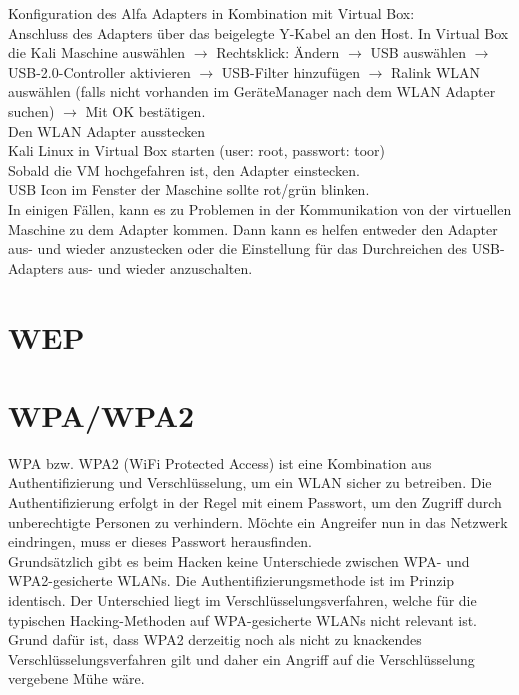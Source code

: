 Konfiguration des Alfa Adapters in Kombination mit Virtual Box:\\

Anschluss des Adapters über das beigelegte Y-Kabel an den Host.
In Virtual Box die Kali Maschine auswählen $\rightarrow$ Rechtsklick: Ändern $\rightarrow$ USB auswählen $\rightarrow$ USB-2.0-Controller aktivieren $\rightarrow$ USB-Filter hinzufügen
$\rightarrow$ Ralink WLAN auswählen (falls nicht vorhanden im GeräteManager nach dem WLAN Adapter suchen) $\rightarrow$ Mit OK bestätigen.\\
Den WLAN Adapter ausstecken\\

Kali Linux in Virtual Box starten (user: root, passwort: toor)\\
Sobald die VM hochgefahren ist, den Adapter einstecken.\\
USB Icon im Fenster der Maschine sollte rot/grün blinken.\\ %

In einigen Fällen, kann es zu Problemen in der Kommunikation von der virtuellen Maschine zu dem Adapter kommen. 
Dann kann es helfen entweder den Adapter aus- und wieder anzustecken oder die Einstellung für das Durchreichen des USB-Adapters aus- und wieder anzuschalten.


\section{WEP}

\section{WPA/WPA2}


WPA bzw. WPA2 (WiFi Protected Access) ist eine Kombination aus Authentifizierung und Verschlüsselung, um ein WLAN sicher zu betreiben. Die Authentifizierung erfolgt in der Regel mit einem Passwort, um den Zugriff durch unberechtigte Personen zu verhindern. Möchte ein Angreifer nun in das Netzwerk eindringen, muss er dieses Passwort herausfinden.\\


Grundsätzlich gibt es beim Hacken keine Unterschiede zwischen WPA- und WPA2-gesicherte WLANs. Die Authentifizierungsmethode ist im Prinzip identisch. Der Unterschied liegt im Verschlüsselungsverfahren, welche für die typischen Hacking-Methoden auf WPA-gesicherte WLANs nicht relevant ist.\\ Grund dafür ist, dass WPA2 derzeitig noch als nicht zu knackendes Verschlüsselungsverfahren
gilt und daher ein Angriff auf die Verschlüsselung vergebene Mühe wäre. \\

